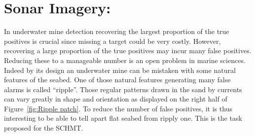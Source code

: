 \documentclass[a4paper,11pt]{report}
\begin{document}
% 		
% 		
% 		

% 		
  \section{Sonar Imagery:}
		\label{sec:Exp/Sonar:}
		
		In underwater mine detection recovering the largest proportion of the true positives is crucial since missing a target could be very costly. However, recovering a large proportion of the true positives may incur many false positives. Reducing these to a manageable number is an open problem in marine sciences. Indeed by its design an underwater mine can be mistaken with some natural features of the seabed. One of those natural features generating many false alarms is called ``ripple''. Those regular patterns drawn in the sand by currents can vary greatly in shape and orientation as displayed on the right half of Figure~\ref{fig:Ripple patch}. To reduce the number of false positives, it is thus interesting to be able to tell apart flat seabed from ripply one. This is the task proposed for the SCHMT.\\
		
\end{document}
